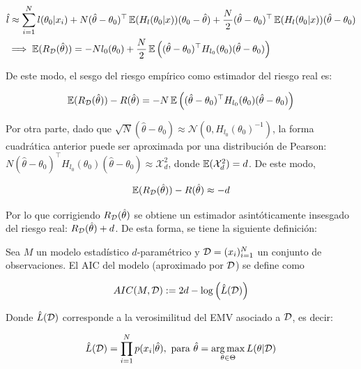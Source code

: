 \begin{align}
	&\hat{l} \approx \sum_{i=1}^N l(\theta_0|x_i) + N(\hat{\theta}-\theta_0)^\top \operatorname{\mathbb{E}}(H_l(\theta_0|x)) (\theta_0-\hat{\theta}) + \frac{N}{2}(\hat{\theta}-\theta_0)^\top \operatorname{\mathbb{E}}(H_l(\theta_0|x)) (\hat{\theta}-\theta_0)\\
	&\implies \operatorname{\mathbb{E}}(R_{\mathcal D}(\hat{\theta})) = -Nl_0(\theta_0) + \frac{N}{2} \operatorname{\mathbb{E}}\left((\hat{\theta}-\theta_0)^\top H_{l_0}(\theta_0) (\hat{\theta}-\theta_0)\right)
\end{align}

De este modo, el sesgo del riesgo empírico como estimador del riesgo real es:

\begin{equation*}
	\operatorname{\mathbb{E}}(R_{\mathcal D}(\hat{\theta})) - R(\hat{\theta}) = -N \operatorname{\mathbb{E}}\left((\hat{\theta}-\theta_0)^\top H_{l_0}(\theta_0) (\hat{\theta}-\theta_0)\right)
\end{equation*}

Por otra parte, dado que $\sqrt{N}\left(\hat{\theta}-\theta_0\right)\approx\mathcal{N}\left(0,H_{l_0}(\theta_0)^{-1}\right)$, la forma cuadrática anterior puede ser aproximada por una distribución de Pearson: $N(\hat{\theta}-\theta_0)^\top H_{l_0}(\theta_0) (\hat{\theta}-\theta_0)\approx\mathcal{X}^2_d$, donde $\operatorname{\mathbb{E}}(\mathcal{X}^2_d)=d$. De este modo,

\begin{equation}
	\operatorname{\mathbb{E}}(R_{\mathcal D}(\hat{\theta})) - R(\hat{\theta}) \approx -d
\end{equation}

Por lo que corrigiendo $R_{\mathcal D}(\hat{\theta})$ se obtiene un estimador asintóticamente insesgado del riesgo real: $R_{\mathcal D}(\hat{\theta})+d$. De esta forma, se tiene la siguiente definición:

\begin{definition}[AIC]
	Sea $M$ un modelo estadístico $d$-paramétrico y ${\mathcal D}=(x_i)_{i=1}^N$ un conjunto de observaciones. El AIC del modelo (aproximado por ${\mathcal D}$) se define como
	
	\begin{equation}
		AIC(M,{\mathcal D}):=2d-\log\left(\hat{L}({\mathcal D})\right)
	\end{equation}
	
	Donde $\hat{L}({\mathcal D})$ corresponde a la verosimilitud del EMV asociado a ${\mathcal D}$, es decir:
	
	\begin{equation}
		\hat{L}({\mathcal D}) = \prod_{i=1}^N p(x_i|\hat{\theta}),\text{ para } \hat{\theta} = \operatorname*{arg\,max}_{\theta\in\Theta} L(\theta|{\mathcal D})
	\end{equation}
\end{definition}

